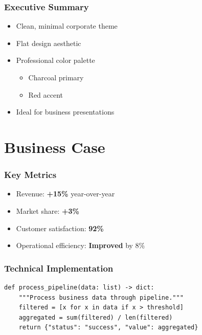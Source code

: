 \documentclass[aspectratio=169]{beamer}
\begin{document}
\titlepage

\begin{frame}
    \frametitle{Executive Summary}
    \begin{itemize}
        \item Clean, minimal corporate theme
        \item Flat design aesthetic
        \item Professional color palette
              \begin{itemize}
                  \item \textcolor{AcmeCharcoal}{Charcoal primary}
                  \item \textcolor{AcmeRed}{Red accent}
              \end{itemize}
        \item Ideal for business presentations
    \end{itemize}
\end{frame}

\section{Business Case}

\begin{frame}
    \frametitle{Key Metrics}
    \begin{itemize}
        \item Revenue: \textcolor{AcmeRed}{\textbf{+15\%}} year-over-year
        \item Market share: \textcolor{AcmeRed}{\textbf{+3\%}}
        \item Customer satisfaction: \textcolor{AcmeRed}{\textbf{92\%}}
        \item Operational efficiency: \textcolor{AcmeRed}{\textbf{Improved}} by 8\%
    \end{itemize}
\end{frame}

\begin{frame}[fragile]
    \frametitle{Technical Implementation}
    \begin{lstlisting}[style=pythonstyle, caption=Data Processing Pipeline]
def process_pipeline(data: list) -> dict:
    """Process business data through pipeline."""
    filtered = [x for x in data if x > threshold]
    aggregated = sum(filtered) / len(filtered)
    return {"status": "success", "value": aggregated}
\end{lstlisting}
\end{frame}
\end{document}
